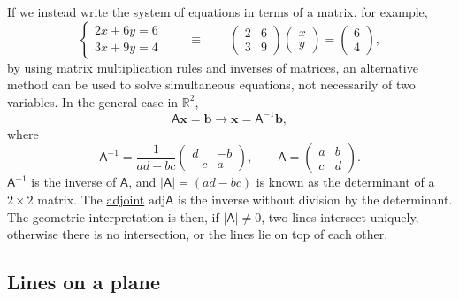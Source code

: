 \documentclass[10pt,notitlepage]{revtex4-1}
\newcommand{\xb}{\boldsymbol{x}}
\newcommand{\bb}{{\boldsymbol{b}}}
\begin{document}
If we instead write the system of equations in terms of a matrix, for example,
\begin{equation}
	\begin{cases}2x+6y=6\\ 3x+9y=4\end{cases}\qquad\equiv\qquad
	\begin{pmatrix}2 & 6\\ 3 & 9\end{pmatrix}\begin{pmatrix}x\\ y\end{pmatrix}
	=\begin{pmatrix}6\\ 4\end{pmatrix},
\end{equation}
by using matrix multiplication rules and inverses of matrices, an alternative
method can be used to solve simultaneous equations, not necessarily of two
variables. In the general case in $\mathbb{R}^2$,
\begin{equation}
	\mathsf{A}\xb=\bb\rightarrow \xb=\mathsf{A}^{-1}\bb,
\end{equation}
where
\begin{equation}
	\mathsf{A}^{-1}=\frac{1}{ad-bc}\begin{pmatrix}d & -b\\ -c & a\end{pmatrix},
	\qquad \mathsf{A}=\begin{pmatrix}a & b\\ c & d\end{pmatrix}.
\end{equation}
$\mathsf{A}^{-1}$ is the \underline{inverse} of $\mathsf{A}$, and
$|\mathsf{A}|=(ad-bc)$ is known as the \underline{determinant} of a $2\times2$
matrix. The \underline{adjoint} $\mbox{adj}\mathsf{A}$ is the inverse without
division by the determinant. The geometric interpretation is then, if
$|\mathsf{A}|\neq0$, two lines intersect uniquely, otherwise there is no
intersection, or the lines lie on top of each other.


\subsection{Lines on a plane}
\end{document}
